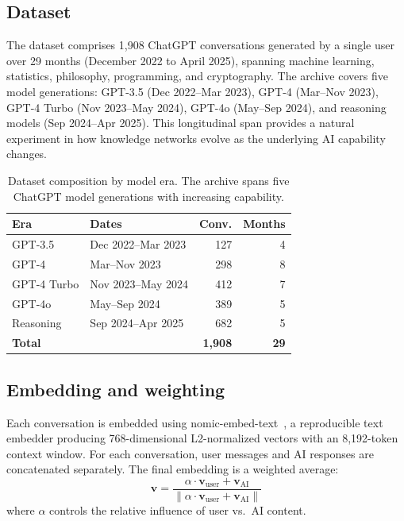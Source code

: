 \documentclass[journal]{IEEEtran}
\begin{document}
\subsection{Dataset}

The dataset comprises 1,908 ChatGPT conversations generated by a single
user over 29 months (December 2022 to April 2025), spanning machine
learning, statistics, philosophy, programming, and cryptography.  The
archive covers five model generations: GPT-3.5 (Dec 2022--Mar 2023),
GPT-4 (Mar--Nov 2023), GPT-4 Turbo (Nov 2023--May 2024), GPT-4o
(May--Sep 2024), and reasoning models (Sep 2024--Apr 2025).  This
longitudinal span provides a natural experiment in how knowledge
networks evolve as the underlying AI capability changes.

\begin{table}[t]
  \centering
  \caption{Dataset composition by model era.  The archive spans five
    ChatGPT model generations with increasing capability.}
  \label{tab:eras}
  \small
  \begin{tabular}{@{}llrr@{}}
    \toprule
    \textbf{Era} & \textbf{Dates} & \textbf{Conv.} & \textbf{Months} \\
    \midrule
    GPT-3.5        & Dec 2022--Mar 2023 &  127 & 4 \\
    GPT-4          & Mar--Nov 2023      &  298 & 8 \\
    GPT-4 Turbo    & Nov 2023--May 2024 &  412 & 7 \\
    GPT-4o         & May--Sep 2024      &  389 & 5 \\
    Reasoning      & Sep 2024--Apr 2025 &  682 & 5 \\
    \midrule
    \textbf{Total} &                    & \textbf{1,908} & \textbf{29} \\
    \bottomrule
  \end{tabular}
\end{table}

\subsection{Embedding and weighting}

Each conversation is embedded using
nomic-embed-text~\cite{nussbaum2024nomic}, a reproducible text embedder
producing 768-dimensional L2-normalized vectors with an 8,192-token
context window.  For each conversation, user messages and AI responses
are concatenated separately.  The final embedding is a weighted average:
\begin{equation}
  \mathbf{v} = \frac{\alpha \cdot \mathbf{v}_\text{user} +
    \mathbf{v}_\text{AI}}{\|\alpha \cdot \mathbf{v}_\text{user} +
    \mathbf{v}_\text{AI}\|}
  \label{eq:embedding}
\end{equation}
where $\alpha$ controls the relative influence of user vs.\ AI content.
\end{document}
